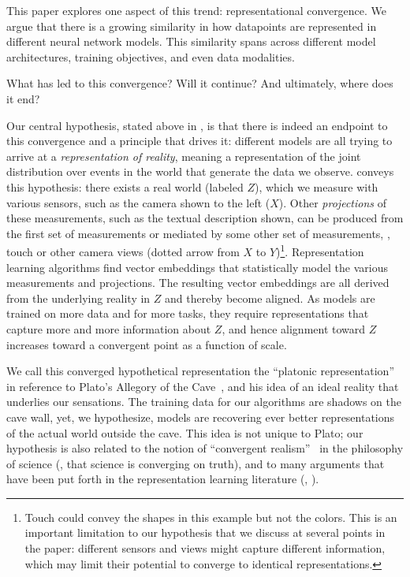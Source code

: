 \documentclass{article}
\newcommand{\bc}[1]{{\color{olive}BC: #1}}
\theoremstyle{plain}
\theoremstyle{definition}
\theoremstyle{remark}
\begin{document}
This paper explores one aspect of this trend: representational convergence. We argue that there is a growing similarity in how datapoints are represented in different neural network models. This similarity spans across different model architectures, training objectives, and even data modalities.

What has led to this convergence? Will it continue? And ultimately, where does it end?

Our central hypothesis, stated above in , is that there is indeed an endpoint to this convergence and a principle that drives it: different models are all trying to arrive at a \textit{representation of reality}, meaning a representation of the joint distribution over events in the world that generate the data we observe.  conveys this hypothesis: there exists a real world (labeled $Z$), which we measure with various sensors, such as the camera shown to the left ($X$). Other \textit{projections} of these measurements, such as the textual description shown, can be produced from the first set of measurements or mediated by some other set of measurements, \eg, touch or other camera views (dotted arrow from $X$ to $Y$)\footnote{Touch could convey the shapes in this example but not the colors. This is an important limitation to our hypothesis that we discuss at several points in the paper: different sensors and views might capture different information, which may limit their potential to converge to identical representations.
}. %
Representation learning algorithms find vector embeddings that statistically model the various measurements and projections. The resulting vector embeddings are all derived from the underlying reality in $Z$ and thereby become aligned. As models are trained on more data and for more tasks, they require representations that capture more and more information about $Z$, and hence alignment toward $Z$ increases toward a convergent point as a function of scale.

We call this converged hypothetical representation the ``platonic representation'' in reference to Plato's Allegory of the Cave~\cite{plato_cave}, and his idea of an ideal reality that underlies our sensations. The training data for our algorithms are shadows on the cave wall, yet, we hypothesize, models are recovering ever better representations of the actual world outside the cave. This idea is not unique to Plato; our hypothesis is also related to the notion of ``convergent realism''~\cite{newton1981rationality,putnam1982three,doppelt2007reconstructing,hardin1982defense} in the philosophy of science (\ie, that science is converging on truth), and to many arguments that have been put forth in the representation learning literature (\eg, \citet{tian2020contrastive,zimmermann2021contrastive,richens2024robust,cao2021explanatory}).
\end{document}
